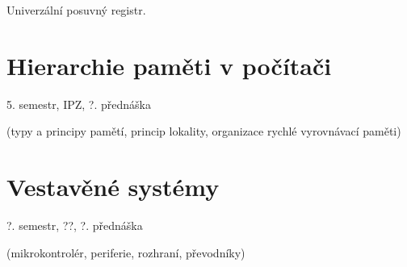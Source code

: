 \documentclass[a4wide]{report}
\begin{document}
Univerzální posuvný registr.















\chapter{Hierarchie paměti v počítači} \label{cha:4}

5. semestr, IPZ, ?. přednáška

(typy a principy pamětí, princip lokality, organizace rychlé vyrovnávací paměti)





















\chapter{Vestavěné systémy} \label{cha:5}

?. semestr, ??, ?. přednáška

(mikrokontrolér, periferie, rozhraní, převodníky)





























\end{document}
